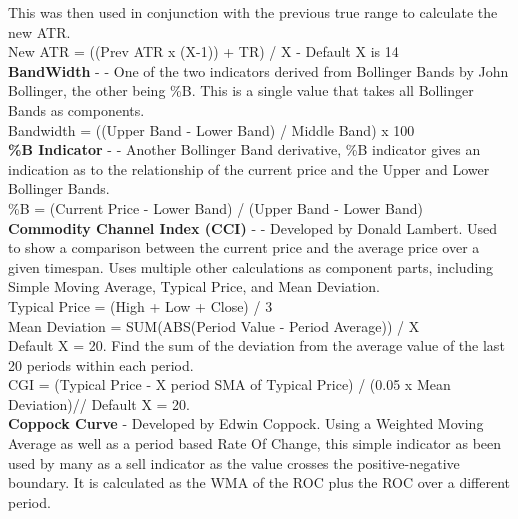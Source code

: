 \documentclass[conference]{IEEEtran}
\begin{document}
\noindent
This was then used in conjunction with the previous true range to calculate the new ATR.\\

\noindent
New ATR = ((Prev ATR x (X-1)) + TR) / X - Default X is 14 \\

\iffalse
[]
\fi

\noindent
\textbf{BandWidth} - \cite{Murphy1999} - One of the two indicators derived from Bollinger Bands by John Bollinger, the other being \%B. This is a single value that takes all Bollinger Bands as components.\\
\noindent
Bandwidth = ((Upper Band - Lower Band) / Middle Band) x 100 \\

\iffalse
[]
\fi

\noindent
\textbf{\%B Indicator} - \cite{Murphy1999} - Another Bollinger Band derivative, \%B indicator gives an indication as to the relationship of the current price and the Upper and Lower Bollinger Bands. \\
\noindent
\%B = (Current Price - Lower Band) / (Upper Band - Lower Band)\\

\iffalse
[]
\fi

\noindent
\textbf{Commodity Channel Index (CCI)} - \cite{Lambert1980} - Developed by Donald Lambert. Used to show a comparison between the current price and the average price over a given timespan. Uses multiple other calculations as component parts, including Simple Moving Average, Typical Price, and Mean Deviation.\\

\noindent
Typical Price = (High + Low + Close) / 3\\

\noindent
Mean Deviation = SUM(ABS(Period Value - Period Average)) / X\\
Default X = 20. Find the sum of the deviation from the average value of the last 20 periods within each period. \\

\noindent
CGI = (Typical Price - X period SMA of Typical Price) / (0.05 x Mean Deviation)//
Default X = 20.\\

\iffalse
[]
\fi

\noindent
\textbf{Coppock Curve} - Developed by Edwin Coppock. Using a Weighted Moving Average as well as a period based Rate Of Change, this simple indicator as been used by many as a sell indicator as the value crosses the positive-negative boundary. It is calculated as the WMA of the ROC plus the ROC over a different period.\\
\end{document}
